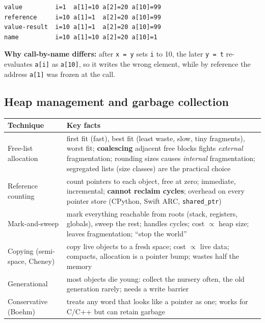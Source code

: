 \documentclass[10pt,a4paper,openany,oneside]{report}
\begin{document}
\begin{lstlisting}[style=out,title={Answer: captured output}]
value         i=1  a[1]=10 a[2]=20 a[10]=99
reference     i=10 a[1]=1  a[2]=20 a[10]=99
value-result  i=10 a[1]=1  a[2]=20 a[10]=99
name          i=10 a[1]=10 a[2]=20 a[10]=1
\end{lstlisting}
\textbf{Why call-by-name differs:} after \texttt{x = y} sets \texttt{i} to 10, the later \texttt{y = t} re-evaluates \texttt{a[i]} as \texttt{a[10]}, so it writes the wrong element, while by reference the address \texttt{a[1]} was frozen at the call.

\subsection{Heap management and garbage collection}
\begin{center}\small
\begin{xltabular}{\textwidth}{@{}L{3.1cm}Y@{}}
\toprule
\textbf{Technique} & \textbf{Key facts}\\
\midrule\endhead
Free-list allocation & first fit (fast), best fit (least waste, slow, tiny fragments), worst fit; \textbf{coalescing} adjacent free blocks fights \emph{external} fragmentation; rounding sizes causes \emph{internal} fragmentation; segregated lists (size classes) are the practical choice\\
Reference counting & count pointers to each object, free at zero; immediate, incremental; \textbf{cannot reclaim cycles}; overhead on every pointer store (CPython, Swift ARC, \texttt{shared\_ptr})\\
Mark-and-sweep & mark everything reachable from roots (stack, registers, globals), sweep the rest; handles cycles; cost $\propto$ heap size; leaves fragmentation; ``stop the world''\\
Copying (semi-space, Cheney) & copy live objects to a fresh space; cost $\propto$ live data; compacts, allocation is a pointer bump; wastes half the memory\\
Generational & most objects die young: collect the nursery often, the old generation rarely; needs a write barrier\\
Conservative (Boehm) & treats any word that looks like a pointer as one; works for C/C++ but can retain garbage\\
\bottomrule
\end{xltabular}
\end{center}
\end{document}
